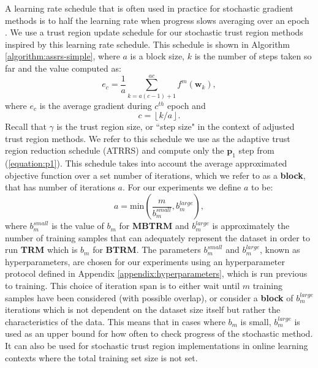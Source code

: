 \documentclass[letterpaper,12pt,titlepage,oneside,final]{book}
\begin{document}
	A learning rate schedule that is often used in practice for stochastic gradient methods is to half the learning rate when progress slows averaging over an epoch \cite{tutorial}. We use a trust region update schedule for our stochastic trust region methods inspired by this learning rate schedule. This schedule is shown in Algorithm \ref{algorithm:assrs-simple}, where $a$ is a block size, $k$ is the number of steps taken so far and the value computed as:
	\begin{equation}
	e_{c} = \frac{1}{a}\sum_{k = a(c-1) + 1}^{ac}{f^{m}(\mathbf{w}_{k})},
	\end{equation}
	where $e_{c}$ is the average gradient during $c^{th}$ epoch and
	\begin{equation}
	c = \left \lfloor{k/a}\right \rfloor.
	\end{equation}
	Recall that $\gamma$ is the trust region size, or ``step size" in the context of adjusted trust region methods.
	 We refer to this schedule we use as the adaptive trust region reduction schedule (ATRRS) and compute only the $\mathbf{p}_{1}$ step from (\ref{equation:p1}). This schedule takes into account the average approximated objective function over a set number of iterations, which we refer to as a \textbf{block}, that has number of iterations $a$. For our experiments we define $a$ to be:
	\begin{equation}
	a = \text{min}(\frac{m}{b_{m}^{small}}, b_{m}^{large}),
	\end{equation}
	where $b_{m}^{small}$ is the value of $b_{m}$ for \textbf{MBTRM} and $b_{m}^{large}$ is approximately the number of training samples that can adequately represent the dataset in order to run \textbf{TRM} which is $b_{m}$ for \textbf{BTRM}. The parameters $b_{m}^{small}$ and $b_{m}^{large}$, known as hyperparameters, are chosen for our experiments using an hyperparameter protocol defined in Appendix \ref{appendix:hyperparameters}, which is run previous to training. This choice of iteration span is to either wait until $m$ training samples have been considered (with possible overlap), or consider a \textbf{block} of $b_{m}^{large}$ iterations which is not dependent on the dataset size itself but rather the characteristics of the data. This means that in cases where $b_{m}$ is small, $b_{m}^{large}$ is used as an upper bound for how often to check progress of the stochastic method. It can also be used for stochastic trust region implementations in online learning contexts where the total training set size is not set.
	
\end{document}

